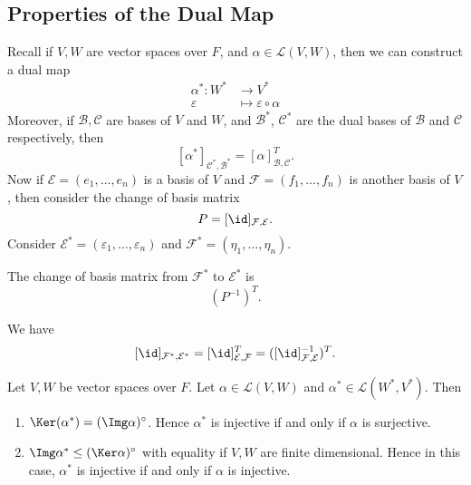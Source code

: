 \documentclass[12pt]{article}
\begin{document}
\subsection{Properties of the Dual Map}%
\label{sub:properties_of_the_dual_map}

Recall if $V, W$ are vector spaces over $F$, and $\alpha \in \mathcal{L}(V, W)$, then we can construct a dual map
\begin{align*}
	\alpha^{\ast} : W^{\ast} &\to V^{\ast} \\
	\varepsilon &\mapsto \varepsilon \circ \alpha
\end{align*}
Moreover, if $\mathcal{B}, \mathcal{C}$ are bases of $V$ and $W$, and $\mathcal{B}^{\ast}$, $\mathcal{C}^{\ast}$ are the dual bases of $\mathcal{B}$ and $\mathcal{C}$ respectively, then
\[
	[\alpha^{\ast}]_{\mathcal{C}^{\ast}, \mathcal{B}^{\ast}} = [\alpha]_{\mathcal{B}, \mathcal{C}}^{T}
.\]
Now if $\mathcal{E} = (e_1, \ldots, e_n)$ is a basis of $V$ and $\mathcal{F} = (f_1, \ldots, f_n)$ is another basis of $V$, then consider the change of basis matrix
\[
	P = [\id]_{\mathcal{F}, \mathcal{E}}
.\]
Consider $\mathcal{E}^{\ast} = (\varepsilon_1, \ldots, \varepsilon_n)$ and $\mathcal{F}^{\ast} = (\eta_1, \ldots, \eta_n)$.

\begin{lemma}
	The change of basis matrix from $\mathcal{F}^{\ast}$ to $\mathcal{E}^{\ast}$ is
	\[
		(P^{-1})^{T}
	.\]
\end{lemma}
\begin{proofbox}
	We have
\[
	[\id]_{\mathcal{F}^{\ast}, \mathcal{E}^{\ast}} = [\id]_{\mathcal{E}, \mathcal{F}}^{T} = ([\id]_{\mathcal{F}, \mathcal{E}}^{-1})^{T}
.\]
\end{proofbox}

\begin{lemma}
	Let $V, W $ be vector spaces over $F$. Let $\alpha \in \mathcal{L}(V, W)$ and $\alpha^{\ast} \in \mathcal{L}(W^{\ast}, V^{\ast})$. Then
	\begin{enumerate}[\normalfont(i)]
		\item $\Ker(\alpha^{\ast}) = (\Img \alpha)^{\circ}$. Hence $\alpha^{\ast}$ is injective if and only if $\alpha$ is surjective.
		\item $\Img \alpha^{\ast} \leq (\Ker \alpha)^{\circ}$ with equality if $V, W$ are finite dimensional. Hence in this case, $\alpha^{\ast}$ is injective if and only if $\alpha$ is injective.
	\end{enumerate}
\end{lemma}
\end{document}
